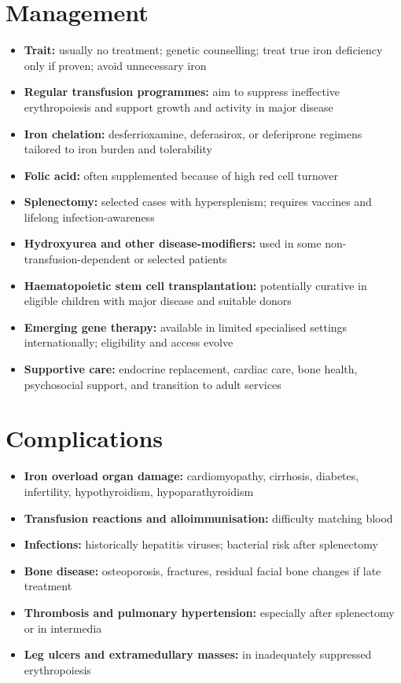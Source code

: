 \section*{Management}
\begin{itemize}
    \item \textbf{Trait:} usually no treatment; genetic counselling; treat true iron deficiency only if proven; avoid unnecessary iron
    \item \textbf{Regular transfusion programmes:} aim to suppress ineffective erythropoiesis and support growth and activity in major disease
    \item \textbf{Iron chelation:} desferrioxamine, deferasirox, or deferiprone regimens tailored to iron burden and tolerability
    \item \textbf{Folic acid:} often supplemented because of high red cell turnover
    \item \textbf{Splenectomy:} selected cases with hypersplenism; requires vaccines and lifelong infection-awareness
    \item \textbf{Hydroxyurea and other disease-modifiers:} used in some non-transfusion-dependent or selected patients
    \item \textbf{Haematopoietic stem cell transplantation:} potentially curative in eligible children with major disease and suitable donors
    \item \textbf{Emerging gene therapy:} available in limited specialised settings internationally; eligibility and access evolve
    \item \textbf{Supportive care:} endocrine replacement, cardiac care, bone health, psychosocial support, and transition to adult services
\end{itemize}

\section*{Complications}
\begin{itemize}
    \item \textbf{Iron overload organ damage:} cardiomyopathy, cirrhosis, diabetes, infertility, hypothyroidism, hypoparathyroidism
    \item \textbf{Transfusion reactions and alloimmunisation:} difficulty matching blood
    \item \textbf{Infections:} historically hepatitis viruses; bacterial risk after splenectomy
    \item \textbf{Bone disease:} osteoporosis, fractures, residual facial bone changes if late treatment
    \item \textbf{Thrombosis and pulmonary hypertension:} especially after splenectomy or in intermedia
    \item \textbf{Leg ulcers and extramedullary masses:} in inadequately suppressed erythropoiesis
\end{itemize}

